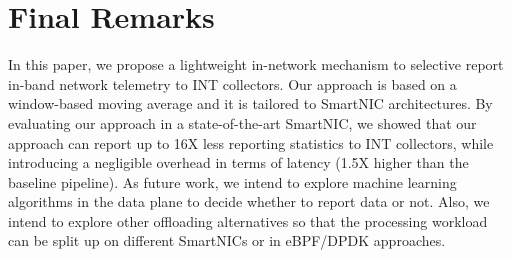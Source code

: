 

\section{Final Remarks}

In this paper, we propose a lightweight in-network mechanism to selective report in-band network telemetry to INT collectors. Our approach is based on a window-based moving average and it is tailored to SmartNIC architectures. By evaluating our approach in a state-of-the-art SmartNIC, we showed that our approach can report up to 16X less reporting statistics to INT collectors, while introducing a negligible overhead in terms of latency (1.5X higher than the baseline pipeline). As future work, we intend to explore machine learning algorithms in the data plane to decide whether to report data or not. Also, we intend to explore other offloading alternatives so that the processing workload can be split up on different SmartNICs or in eBPF/DPDK approaches.












